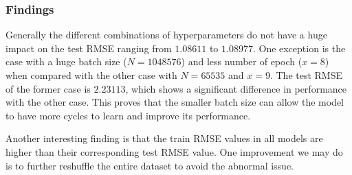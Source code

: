 \documentclass[final]{cvpr}
\begin{document}
\subsubsection{Findings}
Generally the different combinations of hyperparameters do not have a huge impact on the test RMSE ranging from $1.08611$ to $1.08977$.
One exception is the case with a huge batch size ($N=1048576$) and less number of epoch ($x = 8$)
when compared with the other case with $N=65535$ and $x=9$.
The test RMSE of the former case is $2.23113$,
which shows a significant difference in performance with the other case.
This proves that the smaller batch size can allow the model to have more cycles to learn and improve its performance.

Another interesting finding is that the train RMSE values in all models
are higher than their corresponding test RMSE value.
One improvement we may do is to further reshuffle the entire dataset to avoid the abnormal issue.

{\small
	
	
}
\end{document}
